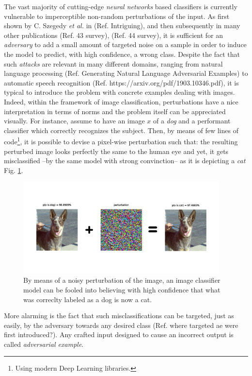 \documentclass[LaM,binding=0.6cm]{./packages/sapthesis/sapthesis}
\begin{document}
        The vast majority of cutting-edge \textit{neural networks} based classifiers is currently vulnerable to imperceptible non-random perturbations of the input.
        As first shown by C. Szegedy \textit{et al.} in (Ref. Intriguing), and then subsequently in many other publications (Ref. 43 survey), (Ref. 44 survey),
        it is sufficient for an \textit{adversary} to add a small amount of targeted noise on a sample in order to induce the model to predict, with high confidence,
        a wrong class. Despite the fact that such \textit{attacks} are relevant in many different domains, ranging from natural language processing (Ref. Generating Natural Language Adversarial Examples) to automatic speech recognition (Ref. https://arxiv.org/pdf/1903.10346.pdf), 
        it is typical to introduce the problem with concrete examples dealing with images.
        Indeed, within the framework of image classification, perturbations have a nice interpretation in terms of norms and the problem itself can be appreciated visually.
        For instance, assume to have an image $x$ of a \textit{dog} and a performant classifier which correctly recognizes the subject. Then, by means of few lines of code\footnote{Using modern Deep Learning libraries.},
        it is possible to devise a pixel-wise perturbation such that: the resulting perturbed image looks perfectly the same to the human eye and yet, it gets misclassified --by the same model with strong convinction--
        as it is depicting a \textit{cat} Fig. \ref{fig:aecatdog}.  
        \begin{figure}[!h]
            \centering
            \includegraphics[width=0.95\textwidth]{prt.png}
            \caption{By means of a noisy perturbation of the image, an image classifier model can be fooled into believing with high confidence that what was correclty labeled as a dog is now a cat.}
            \label{fig:aecatdog}
        \end{figure}
        More alarming is the fact that such misclassifications can be targeted, just as easily, by the adversary towards any desired class (Ref. where targeted ae were first introduced?). Any crafted input designed to 
        cause an incorrect output is called \textit{adversarial example}.
\end{document}
